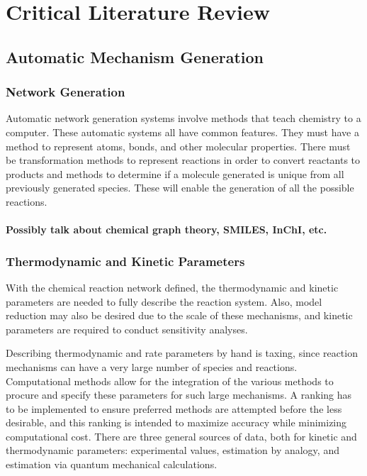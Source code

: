 \documentclass[12pt]{article}
\begin{document}
\section{Critical Literature Review}
\subsection{Automatic Mechanism Generation}



\subsubsection{Network Generation}
Automatic network generation systems involve methods that teach chemistry to a computer. These automatic systems all have common features. They must have a method to represent atoms, bonds, and other molecular properties. There must be transformation methods to represent reactions in order to convert reactants to products and methods to determine if a molecule generated is unique from all previously generated species. These will enable the generation of all the possible reactions.

\paragraph{Possibly talk about chemical graph theory, SMILES, InChI, etc.}

\subsubsection{Thermodynamic and Kinetic Parameters}
With the chemical reaction network defined, the thermodynamic and kinetic parameters are needed to fully describe the reaction system. Also, model reduction may also be desired due to the scale of these mechanisms, and kinetic parameters are required to conduct sensitivity analyses.

Describing thermodynamic and rate parameters by hand is taxing, since reaction mechanisms can have a very large number of species and reactions. Computational methods allow for the integration of the various methods to procure and specify these parameters for such large mechanisms. A ranking has to be implemented to ensure preferred methods are attempted before the less desirable, and this ranking is intended to maximize accuracy while minimizing computational cost. There are three general sources of data, both for kinetic and thermodynamic parameters: experimental values, estimation by analogy, and estimation via quantum mechanical calculations.
\end{document}
